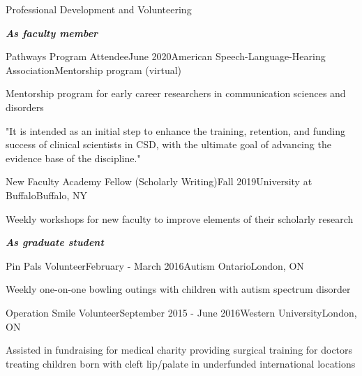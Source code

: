 \documentclass{resume} %
\begin{document}
\begin{rSection}{Professional Development and Volunteering}

\bigskip
\begin{center}
	{\bf \emph{As faculty member}}\\
\end{center}

	\begin{rSubsection}{Pathways Program Attendee}{June 2020}{American Speech-Language-Hearing Association}{Mentorship program (virtual)}
		\item Mentorship program for early career researchers in communication sciences and disorders
		\item "It is intended as an initial step to enhance the training, retention, and funding success of clinical scientists in CSD, with the ultimate goal of advancing the evidence base of the discipline."
	\end{rSubsection}

	\begin{rSubsection}{New Faculty Academy Fellow (Scholarly Writing)}{Fall 2019}{University at Buffalo}{Buffalo, NY}
		\item Weekly workshops for new faculty to improve elements of their scholarly research
	\end{rSubsection}

\bigskip
\begin{center}
	{\bf \emph{As graduate student}}\\
\end{center}

	\begin{rSubsection}{Pin Pals Volunteer}{February - March 2016}{Autism Ontario}{London, ON}
	\item Weekly one-on-one bowling outings with children with autism spectrum disorder
	
	\end{rSubsection}
	
	
	\begin{rSubsection}{Operation Smile Volunteer}{September 2015 - June 2016}{Western University}{London, ON}
	\item Assisted in fundraising for medical charity providing surgical training for doctors treating children born with cleft lip/palate in underfunded international locations
	
	\end{rSubsection}
	

\end{rSection}
\end{document}
